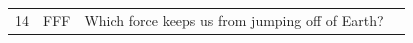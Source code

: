 \documentclass[10pt]{article}
\begin{document}
\begin{tiny}
\begin{longtable}{r p{0.3in} p{1.212in} p{3.8in}}
    14 &          FFF &                                                                                                                                                                                                                                  Which force keeps us from jumping off of Earth? &                                                                                                                                                                                                                                                                                                                                                                                                                                                                                                                                                                                                                                                                                                                                                                                                                                                                                                                                                                                                                                                                                                                                                                                                                                                                                                                                                                                                                                                                                                                                                                                                                                                                                                                                                                                                                                                                                                                                                                                                                                                                                                                                                                                                                                                                                                                                                                                                                                                                                                                                                                                                                                                                                                                                                                                                                                                                                                                                                                                                                                                                                               
\end{longtable}
\end{tiny}
\end{document}
